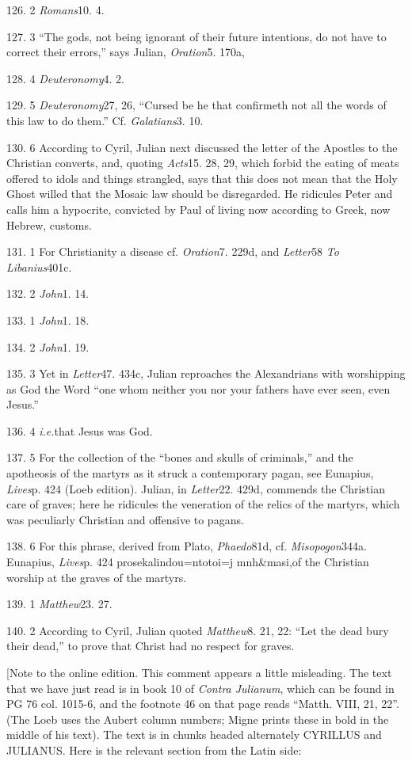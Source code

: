 126. 2 \emph{Romans}10. 4.

127. 3 ``The gods, not being ignorant of their future intentions, do not have to correct their errors,'' says Julian, \emph{Oration}5. 170a,

128. 4 \emph{Deuteronomy}4. 2.

129. 5 \emph{Deuteronomy}27, 26, ``Cursed be he that confirmeth not all the words of this law to do them.'' Cf. \emph{Galatians}3. 10.

130. 6 According to Cyril, Julian next discussed the letter of the Apostles to the Christian converts, and, quoting \emph{Acts}15. 28, 29, which forbid the eating of meats offered to idols and things strangled, says that this does not mean that the Holy Ghost willed that the Mosaic law should be disregarded. He ridicules Peter and calls him a hypocrite, convicted by Paul of living now according to Greek, now Hebrew, customs.

131. 1 For Christianity a disease cf. \emph{Oration}7. 229d, and \emph{Letter}58
\emph{To Libanius}401c.

132. 2 \emph{John}1. 14.

133. 1 \emph{John}1. 18.

134. 2 \emph{John}1. 19.

135. 3 Yet in \emph{Letter}47. 434c, Julian reproaches the Alexandrians with worshipping as God the Word ``one whom neither you nor your fathers have ever seen, even Jesus.''

136. 4 \emph{i.e.}that Jesus was God.

137. 5 For the collection of the ``bones and skulls of criminals,'' and the apotheosis of the martyrs as it struck a contemporary pagan, see Eunapius, \emph{Lives}p. 424 (Loeb edition). Julian, in
\emph{Letter}22. 429d, commends the Christian care of graves; here he ridicules the veneration of the relics of the martyrs, which was peculiarly Christian and offensive to pagans.

138. 6 For this phrase, derived from Plato, \emph{Phaedo}81d, cf. \emph{Misopogon}344a. Eunapius, \emph{Lives}p. 424 prosekalindou=nto\emph{}toi=j mnh\&masi,\emph{}of the Christian worship at the graves of the martyrs.

139. 1 \emph{Matthew}23. 27.

140. 2 According to Cyril, Julian quoted \emph{Matthew}8. 21, 22: ``Let the dead bury their dead,'' to prove that Christ had no respect for graves.

[Note to the online edition. This comment appears a little
misleading. The text that we have just read is in book 10 of \emph{Contra
Julianum}, which can be found in PG 76 col. 1015-6, and the footnote 46 on
that page reads ``Matth. VIII, 21, 22''. (The Loeb uses the Aubert
column numbers; Migne prints these in bold in the middle of his text).
The text is in chunks headed alternately CYRILLUS and JULIANUS. Here is the
relevant section from the Latin side:

